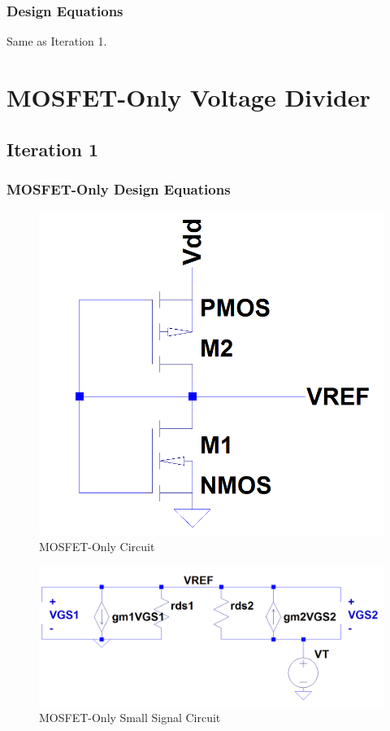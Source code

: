 \documentclass[conference]{IEEEtran}
\begin{document}
\subsubsection{Design Equations}
Same as Iteration 1.
\section{MOSFET-Only Voltage Divider}
\subsection{Iteration 1}
\subsubsection{MOSFET-Only Design Equations}
\begin{figure}[!htbp]
  \centering
  \includegraphics[scale=0.25]{images/mosfet-only1.png}
  \caption[mosfet-only1]{MOSFET-Only Circuit}
  \label{fig:mosfet-only1}
\end{figure}
\begin{figure}[!htbp]
  \centering
  \includegraphics[scale=0.25]{images/mosfet-only1-ss.png}
  \caption[mosfet-only1-ss]{MOSFET-Only Small Signal Circuit}
  \label{fig:mosfet-only1-ss}
\end{figure}
\end{document}
